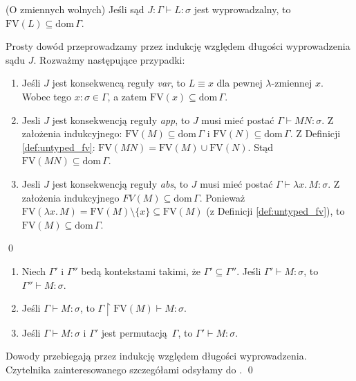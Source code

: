\begin{lemat}(O zmiennych wolnych)
  Jeśli sąd \(J: \Gamma \vdash L:\sigma\) jest wyprowadzalny, to \(\mathrm{FV}(L)\subseteq \mathrm{dom}\,\Gamma\).
\end{lemat}
\begin{dowod}
  Prosty dowód przeprowadzamy przez indukcję względem długości wyprowadzenia sądu \(J\). Rozważmy następujące przypadki:
  \begin{enumerate}[label=(\alph*)]
    \setlength\itemsep{0em}
    \item Jeśli \(J\) jest konsekwencą reguły \emph{var}, to \(L\equiv x\) dla pewnej \(\lambda\)-zmiennej \(x\). Wobec tego \(x:\sigma\in\Gamma\), a zatem \(\mathrm{FV}(x)\subseteq\mathrm{dom}\,\Gamma\).
    \item Jesli \(J\) jest konsekwencją reguły \emph{app}, to \(J\) musi mieć postać \(\Gamma\vdash MN:\sigma\). Z założenia indukcyjnego: \(\mathrm{FV}(M)\subseteq \mathrm{dom}\,\Gamma\) i  \(\mathrm{FV}(N)\subseteq \mathrm{dom}\,\Gamma\). Z Definicji \ref{def:untyped_fv}: \(\mathrm{FV}(MN)=\mathrm{FV}(M)\cup\mathrm{FV}(N)\). Stąd \(\mathrm{FV}(MN)\subseteq \mathrm{dom}\,\Gamma\).
    \item Jesli \(J\) jest konsekwencją reguły \emph{abs}, to \(J\) musi mieć postać \(\Gamma\vdash \lambda x.\,M:\sigma\). Z założenia indukcyjnego \(FV(M)\subseteq\mathrm{dom}\,\Gamma\). Ponieważ \(\mathrm{FV}(\lambda x.\,M)=\mathrm{FV}(M)\setminus\{x\}\subseteq\mathrm{FV}(M)\) (z Definicji \ref{def:untyped_fv}), to \(\mathrm{FV}(M)\subseteq\mathrm{dom}\,\Gamma\). 
  \end{enumerate}  
  \qed
\end{dowod}

\begin{lemat}\label{thm:permutation_simple}
  \begin{enumerate}[label=(\arabic*), ref=(\arabic*)]
    \setlength\itemsep{0em}
    \item Niech \(\Gamma'\) i \(\Gamma''\) bedą kontekstami takimi, że \(\Gamma' \subseteq \Gamma''\). Jeśli \(\Gamma'\vdash M:\sigma\), to \(\Gamma''\vdash M:\sigma\).
    \item Jeśli \(\Gamma\vdash M:\sigma\), to \(\Gamma \upharpoonright \mathrm{FV}(M)\vdash M:\sigma\).
    \item Jeśli \(\Gamma\vdash M:\sigma\) i \(\Gamma'\) jest permutacją \(\Gamma\), to \(\Gamma'\vdash M:\sigma\).\label{thm:permutation_3}
  \end{enumerate}
\end{lemat}
\begin{dowod}
  Dowody przebiegają przez indukcję względem długości wyprowadzenia. Czytelnika zainteresowanego szczegółami odsyłamy do \cite[Tw. 3.1.7]{Barendregt_1992}. 
  \qed
\end{dowod}

